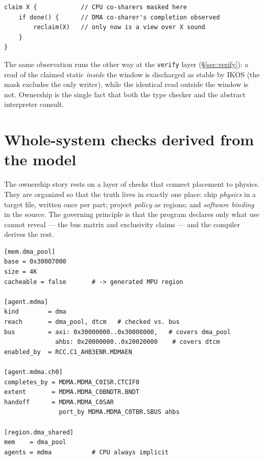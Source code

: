 \documentclass[10pt,twocolumn]{article}
\begin{document}
\begin{lstlisting}
claim X {            // CPU co-sharers masked here
    if done() {      // DMA co-sharer's completion observed
        reclaim(X)   // only now is a view over X sound
    }
}
\end{lstlisting}

The same observation runs the other way at the \texttt{verify} layer
(\S\ref{sec:verify}): a read of the claimed static \emph{inside} the window is
discharged as stable by IKOS (the mask excludes the only writer), while the
identical read outside the window is not. Ownership is the single fact that both the type
checker and the abstract interpreter consult.

\section{Whole-system checks derived from the model}
\label{sec:checks}

The ownership story rests on a layer of checks that connect placement to
physics. They are organized so that the truth lives in exactly one place: chip
\emph{physics} in a target file, written once per part; project \emph{policy} as
regions; and \emph{software binding} in the source. The governing principle is
that the program declares only what use cannot reveal --- the bus matrix and
exclusivity claims --- and the compiler derives the rest.

\begin{table}[t]
\centering
\footnotesize
\begin{lstlisting}
[mem.dma_pool]
base = 0x30007000
size = 4K
cacheable = false       # -> generated MPU region

[agent.mdma]
kind        = dma
reach       = dma_pool, dtcm   # checked vs. bus
bus         = axi: 0x30000000..0x30008000,   # covers dma_pool
              ahbs: 0x20000000..0x20020000    # covers dtcm
enabled_by  = RCC.C1_AHB3ENR.MDMAEN

[agent.mdma.ch0]
completes_by = MDMA.MDMA_C0ISR.CTCIF0
extent       = MDMA.MDMA_C0BNDTR.BNDT
handoff      = MDMA.MDMA_C0SAR
               port_by MDMA.MDMA_C0TBR.SBUS ahbs

[region.dma_shared]
mem    = dma_pool
agents = mdma           # CPU always implicit
\end{lstlisting}
\caption{A target-file fragment (the physics layer). No key takes a raw address:
every register is an SVD path, so a stray literal fails at resolution rather than
silently configuring hardware.}
\label{tab:target}
\end{table}
\end{document}
